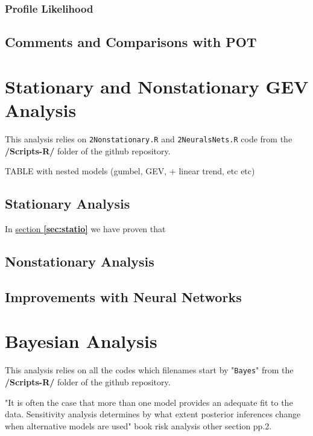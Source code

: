 \documentclass[11pt,a4paper,openany ]{book}
\begin{document}
\subsection{Profile Likelihood}



\section{Comments and Comparisons with POT}




\chapter{Stationary and Nonstationary GEV Analysis}\label{sec:ananonsta}
\minitoc \thispagestyle{empty}

This analysis relies on \texttt{2Nonstationary.R} and \texttt{2NeuralsNets.R} code from the \textbf{/Scripts-R/} folder of the github repository.

TABLE with nested models (gumbel, GEV, + linear trend, etc etc)


\section{Stationary Analysis}


In \hyperref[sec:statio]{section \textbf{\ref{sec:statio}}} we have proven that 

\section{Nonstationary Analysis}

\section{Improvements with Neural Networks}


\chapter{Bayesian Analysis}
\minitoc \thispagestyle{empty}

This analysis relies on all the codes which filenames start by "\texttt{Bayes}" from the \textbf{/Scripts-R/} folder of the github repository.


"It is often the case that more than one model provides an adequate fit to the data. Sensitivity analysis determines by what extent posterior inferences change when alternative
models are used"   book risk analysis other section pp.2.
\end{document}
